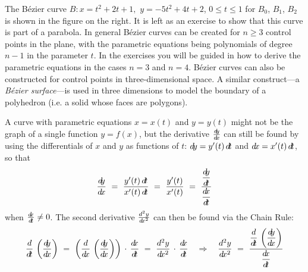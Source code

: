 \begin{exmp}
The B\'{e}zier curve $B: x=t^2 + 2t + 1,$ $y=-5t^2 + 4t + 2$, $0 \le t \le 1$
for $B_0$, $B_1$, $B_2$ is shown in the figure on the right. It is left as an
exercise to show that this curve is part of a parabola. In general B\'{e}zier
curves can be created for $n \ge 3$ control points in the plane, with the
parametric equations being polynomials of degree $n-1$ in the parameter $t$. In
the exercises you will be guided in how to derive the parametric equations in
the cases $n=3$ and $n=4$. B\'{e}zier curves can also be constructed for
control points in three-dimensional space. A similar construct---a
\emph{B\'{e}zier surface}---is used in three dimensions to model the boundary of
a polyhedron (i.e. a solid whose faces are polygons).
\end{exmp}
\divider
\newpage
A curve with parametric equations $x=x(t)$ and $y=y(t)$ might not be the graph
of a single function $y=f(x)$, but the derivative $\frac{d\negmedspace y}{d\!x}$ can still be found by
using the differentials of $x$ and $y$ as functions of $t$: $d\!y=y'(t)\,d\!t$ and
$d\!x=x'(t)\,d\!t$, so that
\begin{equation}\label{eqn:paramderiv1}
\dydx ~=~ \frac{y'(t)\,\dt}{x'(t)\,\dt} ~=~ \frac{y'(t)}{x'(t)}
~=~ \frac{\Dydt}{\Dxdt}
\end{equation}
when $\frac{d\negmedspace x}{d\!t} \ne 0$. The second derivative $\frac{d^2y}{d\!x^2}$ can then be found
via the Chain Rule:
\begin{equation}\label{eqn:paramderiv2}
\ddt\,\left(\dydx\right) ~=~ \left(\ddx\,\left(\dydx\right)\right)\,\cdot\,\dxdt ~=~
\frac{d^2y}{\dx^2} \,\cdot\,\dxdt \quad\Rightarrow\quad
\frac{d^2y}{\dx^2} ~=~ \frac{\Ddt\,\left(\Dydx\right)}{\Dxdt}
\end{equation}
